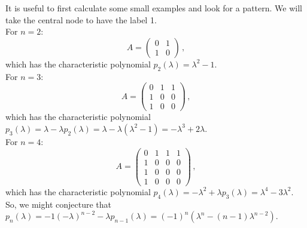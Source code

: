 \documentclass[11pt]{article}
\begin{document}
It is useful to first calculate some small examples and look for a pattern. We will take the central node to have the label 1.\\ 
For $n=2:$ \[ A= \begin{pmatrix} 0 & 1 \\ 1 & 0 \end{pmatrix} \,, \] which has the characteristic polynomial $p_2(\lambda) = \lambda^2 - 1.$ \\
For $n=3:$ \[ A= \begin{pmatrix} 0 & 1 & 1 \\ 1 & 0 & 0 \\ 1 & 0 & 0 \end{pmatrix} \,, \] which has the characteristic polynomial $p_3(\lambda) = \lambda-\lambda p_2(\lambda) = \lambda -\lambda(\lambda^2-1) =  -\lambda^3 +2\lambda.$ \\
For $n=4:$ \[ A = \begin{pmatrix} 0 & 1 & 1 & 1 \\ 1 & 0 & 0 & 0\\1 & 0 & 0 & 0 \\1 & 0 & 0 & 0 \end{pmatrix} \,, \] which has the characteristic polynomial $p_4(\lambda) = -\lambda^2+\lambda p_3(\lambda) = \lambda^4 -3\lambda^2.$ \\
So, we might conjecture that $p_n(\lambda) = -1(-\lambda)^{n-2} -\lambda p_{n-1}(\lambda) = (-1)^n \left(\lambda^{n} - (n-1)\lambda^{n-2}\right)$. \\
\end{document}
